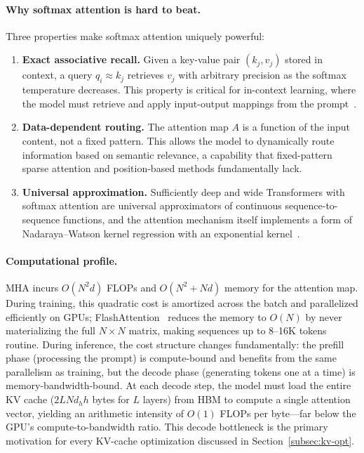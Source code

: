 \paragraph{Why softmax attention is hard to beat.}
Three properties make softmax attention uniquely powerful:
\begin{enumerate}
\item \textbf{Exact associative recall.} Given a key-value pair $(k_j, v_j)$ stored in context, a query $q_i \approx k_j$ retrieves $v_j$ with arbitrary precision as the softmax temperature decreases. This property is critical for in-context learning, where the model must retrieve and apply input-output mappings from the prompt~\cite{olsson2022context}.
\item \textbf{Data-dependent routing.} The attention map $A$ is a function of the input content, not a fixed pattern. This allows the model to dynamically route information based on semantic relevance, a capability that fixed-pattern sparse attention and position-based methods fundamentally lack.
\item \textbf{Universal approximation.} Sufficiently deep and wide Transformers with softmax attention are universal approximators of continuous sequence-to-sequence functions, and the attention mechanism itself implements a form of Nadaraya--Watson kernel regression with an exponential kernel~\cite{tay2020efficient}.
\end{enumerate}

\paragraph{Computational profile.}
MHA incurs $O(N^2 d)$ FLOPs and $O(N^2 + Nd)$ memory for the attention map. During training, this quadratic cost is amortized across the batch and parallelized efficiently on GPUs; FlashAttention~\cite{dao2022flashattention} reduces the memory to $O(N)$ by never materializing the full $N \times N$ matrix, making sequences up to 8--16K tokens routine. During inference, the cost structure changes fundamentally: the prefill phase (processing the prompt) is compute-bound and benefits from the same parallelism as training, but the decode phase (generating tokens one at a time) is memory-bandwidth-bound. At each decode step, the model must load the entire KV cache ($2LNd_h h$ bytes for $L$ layers) from HBM to compute a single attention vector, yielding an arithmetic intensity of $O(1)$ FLOPs per byte---far below the GPU's compute-to-bandwidth ratio. This decode bottleneck is the primary motivation for every KV-cache optimization discussed in Section~\ref{subsec:kv-opt}.

